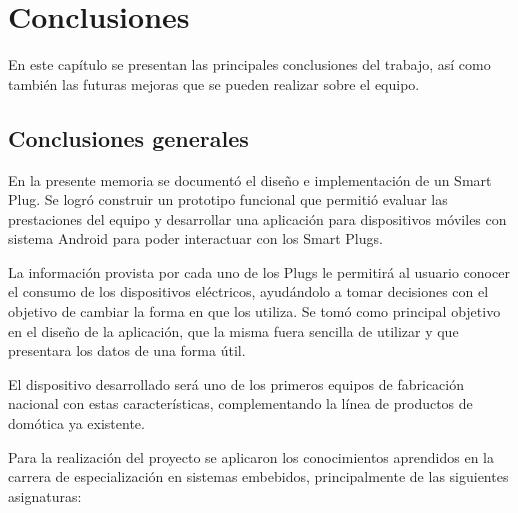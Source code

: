 
\chapter{Conclusiones} %

\label{Chapter5} %

En este capítulo se presentan las principales conclusiones del trabajo, así como también las futuras mejoras que se pueden realizar sobre el equipo.


\section{Conclusiones generales}

En la presente memoria se documentó el diseño e implementación de un Smart Plug. Se logró construir un prototipo funcional que permitió evaluar las prestaciones del equipo y desarrollar una aplicación para dispositivos móviles con sistema Android para poder interactuar con los Smart Plugs. 

La información provista por cada uno de los Plugs le permitirá al usuario conocer el consumo de los dispositivos eléctricos, ayudándolo a tomar decisiones con el objetivo de cambiar la forma en que los utiliza. Se tomó como principal objetivo en el diseño de la aplicación, que la misma fuera sencilla de utilizar y que presentara los datos de una forma útil.

El dispositivo desarrollado será uno de los primeros equipos de fabricación nacional con estas características, complementando la línea de productos de domótica ya existente.

Para la realización del proyecto se aplicaron los conocimientos aprendidos en la carrera de especialización en sistemas embebidos, principalmente de las siguientes asignaturas:

